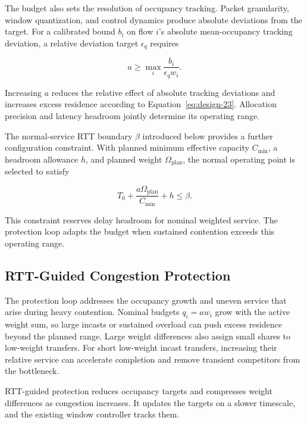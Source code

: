The budget also sets the resolution of occupancy tracking. Packet granularity, window quantization, and control dynamics produce absolute deviations from the target. For a calibrated bound \(b_i\) on flow \(i\)'s absolute mean-occupancy tracking deviation, a relative deviation target \(\epsilon_q\) requires

\begin{equation}
\label{eq:design-26}
a\ge
\max_i\frac{b_i}{\epsilon_qw_i}.
\end{equation}

Increasing \(a\) reduces the relative effect of absolute tracking deviations and increases excess residence according to Equation~\eqref{eq:design-23}. Allocation precision and latency headroom jointly determine its operating range.

The normal-service RTT boundary \(\beta\) introduced below provides a further configuration constraint. With planned minimum effective capacity \(C_{\min}\), a headroom allowance \(h\), and planned weight \(\Omega_{\mathrm{plan}}\), the normal operating point is selected to satisfy

\begin{equation}
\label{eq:design-27}
T_0+\frac{a\Omega_{\mathrm{plan}}}{C_{\min}}+h
\le\beta.
\end{equation}

This constraint reserves delay headroom for nominal weighted service. The protection loop adapts the budget when sustained contention exceeds this operating range.

\subsection{RTT-Guided Congestion Protection}
\label{sec:protection}

The protection loop addresses the occupancy growth and uneven service that arise during heavy contention. Nominal budgets \(q_i=aw_i\) grow with the active weight sum, so large incasts or sustained overload can push excess residence beyond the planned range. Large weight differences also assign small shares to low-weight transfers. For short low-weight incast transfers, increasing their relative service can accelerate completion and remove transient competitors from the bottleneck.

RTT-guided protection reduces occupancy targets and compresses weight differences as congestion increases. It updates the targets on a slower timescale, and the existing window controller tracks them.

